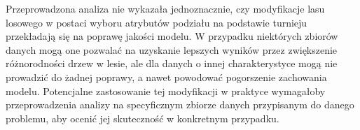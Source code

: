 \documentclass[a4paper]{article}
\begin{document}
Przeprowadzona analiza nie wykazała jednoznacznie, czy modyfikacje lasu losowego w postaci wyboru atrybutów podziału na podstawie turnieju
przekładają się na poprawę jakości modelu. W przypadku niektórych zbiorów danych mogą one pozwalać na uzyskanie lepszych wyników przez zwiększenie
różnorodności drzew w lesie, ale dla danych o innej charakterystyce mogą nie prowadzić do żadnej poprawy, a nawet powodować pogorszenie
zachowania modelu. Potencjalne zastosowanie tej modyfikacji w praktyce wymagałoby przeprowadzenia analizy na specyficznym zbiorze danych
przypisanym do danego problemu, aby ocenić jej skuteczność w konkretnym przypadku.
\end{document}
